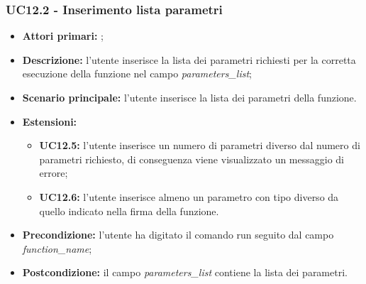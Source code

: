 \subsubsection{UC12.2 - Inserimento lista parametri}
\begin{itemize}
	\item \textbf{Attori primari:} \ua{};
	\item \textbf{Descrizione:} l’utente inserisce la lista dei parametri richiesti per la corretta esecuzione della funzione nel campo \textit{parameters\_list};
	\item \textbf{Scenario principale:}  l'utente inserisce la lista dei parametri della funzione. 
	\item \textbf{Estensioni:} 
	\begin{itemize}
		\item \textbf{UC12.5:}  l’utente inserisce un numero di parametri diverso dal numero di parametri richiesto, di conseguenza viene visualizzato un messaggio di errore; 
		\item \textbf{UC12.6:} l'utente inserisce almeno un parametro con tipo diverso da quello indicato nella firma della funzione.
	\end{itemize}
	\item \textbf{Precondizione:} l’utente ha digitato il comando run seguito dal campo \textit{function\_name};
	\item \textbf{Postcondizione:} il campo \textit{parameters\_list} contiene la lista dei parametri.
\end{itemize}